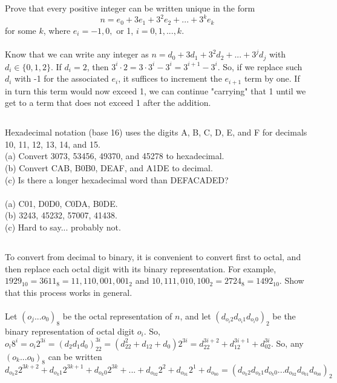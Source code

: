 \documentclass{article} \usepackage{amsmath}
\begin{document}
\subsection{}
Prove that every positive integer can be written unique in the form
\begin{equation*}
    n = e_0 + 3e_1 + 3^2e_2 + ... + 3^ke_k
\end{equation*}
for some $k$, where $e_i = -1, 0,$ or 1, $i = 0, 1, ..., k$.\\~\\
Know that we can write any integer as $n = d_0 + 3d_1 + 3^2d_2 + ... + 3^jd_j$
with $d_i \in \{0, 1, 2\}$.
If $d_i = 2$, then $3^i \cdot 2 = 3 \cdot 3^i - 3^i = 3^{i+1} - 3^i$.
So, if we replace such $d_i$ with -1 for the associated $e_i$,
it suffices to increment the $e_{i + 1}$ term by one.
If in turn this term would now exceed 1, we can continue "carrying"
that 1 until we get to a term that does not exceed 1 after the addition.

\subsection{}
Hexadecimal notation (base 16) uses the digits A, B, C, D, E, and F
for decimals 10, 11, 12, 13, 14, and 15.\\
(a) Convert 3073, 53456, 49370, and 45278 to hexadecimal.\\
(b) Convert CAB, B0B0, DEAF, and A1DE to decimal.\\
(c) Is there a longer hexadecimal word than DEFACADED?\\~\\
(a) C01, D0D0, C0DA, B0DE.\\
(b) 3243, 45232, 57007, 41438.\\
(c) Hard to say... probably not.

\subsection{}
To convert from decimal to binary, it is convenient to convert first to
octal, and then replace each octal digit with its binary representation.
For example, $1929_{10} = 3611_8 = 11,110,001,001_2$ and
$10,111,010,100_2 = 2724_8 = 1492_{10}$.
Show that this process works in general.\\~\\
Let $(o_j...o_0)_8$ be the octal representation of $n$,
and let $(d_{o_i2}d_{o_i1}d_{o_i0})_2$ be the binary representation of
octal digit $o_i$.
So, $o_i8^i = o_i2^{3i} = (d_2d_1d_0)_22^{3i} = (d_22^2 + d_12 + d_0)2^{3i}
= d_22^{3i + 2} + d_12^{3i + 1} + d_02^{3i}$.
So, any $(o_k...o_0)_8$ can be written
$d_{o_k2}2^{3k + 2} + d_{o_k1}2^{3k + 1} + d_{o_k0}2^{3k} + ...
+ d_{o_02}2^{2} + d_{o_01}2^{1} + d_{o_00} = 
(d_{o_k2}d_{o_k1}d_{o_k0}...d_{o_02}d_{o_01}d_{o_00})_2$
\end{document}
